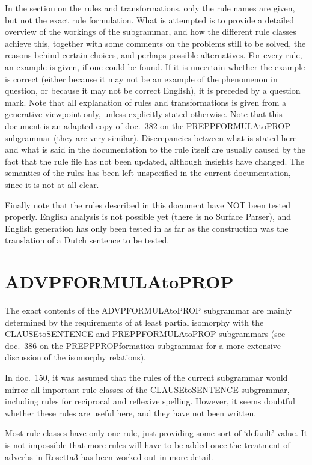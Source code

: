 In the section on the rules and transformations, only the rule names are given, 
but not the exact rule formulation. What is attempted 
is to provide a detailed overview of the workings of the subgrammar, and 
how the different rule classes achieve this,
together with some comments on the problems still to be solved, the reasons 
behind certain choices, and perhaps possible alternatives. For every rule, an 
example is given, if one could be found. 
If it is uncertain whether the example is correct (either 
because it may not be an example of the phenomenon in question, or because it 
may not be correct English), it is preceded by a question mark. Note that all 
explanation of rules and transformations is given from a generative viewpoint
only, unless explicitly stated otherwise. Note that this 
document is an adapted copy of doc.\ 382 on the PREPPFORMULAtoPROP subgrammar 
(they are very similar).
Discrepancies between what is stated here and what is 
said in the documentation to the rule itself are usually caused by 
the fact that the rule file has 
not  been updated, although insights have changed. The semantics of the rules 
has been left unspecified in the current documentation, since it is not at all 
clear.

Finally note that the rules described in this document have NOT been tested 
properly. English analysis is not possible yet (there is no Surface Parser), and 
English generation has only been tested in as far as the construction was the 
translation of a Dutch sentence to be tested.

\newpage
\section{ADVPFORMULAtoPROP}
The exact contents of the ADVPFORMULAtoPROP subgrammar are mainly determined 
by the requirements of at least partial isomorphy with the CLAUSEtoSENTENCE 
and PREPPFORMULAtoPROP subgrammars (see doc.\ 386 on the PREPPPROPformation 
subgrammar for a more extensive discussion of the isomorphy relations). 

In doc.\ 150, it was assumed that the rules of the current subgrammar would 
mirror all important rule classes of the CLAUSEtoSENTENCE subgrammar, including 
rules for reciprocal and reflexive spelling. However, it seems doubtful whether 
these rules are useful here, and they have not been written. 

Most rule classes have only one rule, just providing some sort of 
`default' value. It is not impossible that more rules will have to be added 
once the treatment of adverbs in Rosetta3 has been worked out in more detail.

